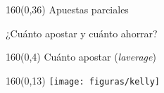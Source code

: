 \documentclass[shownotes,aspectratio=169]{beamer}
\begin{document}
%
%
%
%
%
%
%
%


\begin{frame}[plain]
\begin{textblock}{160}(0,36)
\centering \huge Apuestas parciales

\vspace{0.4cm} \LARGE

¿Cuánto apostar y cuánto ahorrar?

\end{textblock}
\end{frame}



\begin{frame}[plain]
\begin{textblock}{160}(0,4)
\centering \LARGE Cuánto apostar (\textit{laverage})
\end{textblock}

\begin{textblock}{160}(0,13) \centering
\texttt{[image: figuras/kelly]}
\end{textblock}


\end{frame}
\end{document}
